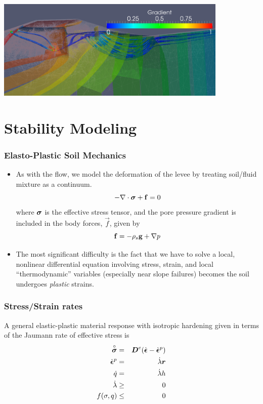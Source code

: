 \documentclass{beamer}
\newcommand{\Jrate}[1]{\stackrel{\circ}{#1}}
\begin{document}
\begin{frame}
\includegraphics[width=4.35in]{pocketLevee3d_pipe.png}
\end{frame}

\section{Stability Modeling}

\begin{frame}
  \frametitle{Elasto-Plastic Soil Mechanics}
  \begin{itemize}
    \item As with the flow, we model the deformation of the levee by
      treating soil/fluid mixture as a continuum.
      \begin{equation}
        - \nabla \cdot \mbox{{\boldmath ${\sigma}$}}  + {\bf f} = 0
      \end{equation}
      where $\mbox{{\boldmath ${\sigma}$}}$ is the effective stress tensor, and the pore
      pressure gradient is included in the body forces, $\vec f$, given by
      \begin{equation}
        {\bf f} = -\rho_s {\bf g} + \nabla p
      \end{equation}
    \item The most significant difficulty is the fact that we have to solve a local, nonlinear differential equation involving stress, strain, and local ``thermodynamic'' variables (especially near slope failures) becomes the soil undergoes {\em plastic} strains.
  \end{itemize}
\end{frame}

\begin{frame}
  \frametitle{Stress/Strain rates} A general elastic-plastic material
  response with isotropic hardening given in terms of the Jaumann rate
  of effective stress is
\begin{eqnarray}
\Jrate{\ten{ \sigma}}  &=& \ten D^e (\dot{\ten \epsilon} - \dot{\ten \epsilon}^p) \\
\dot{\ten \epsilon}^p &=& \dot{\lambda} \ten r \\
\dot{q} &=& \dot{\lambda} h \\
\dot{\lambda} &\geq& 0 \\
f(\sigma,q) &\leq& 0
\end{eqnarray}
\end{frame}
\end{document}
